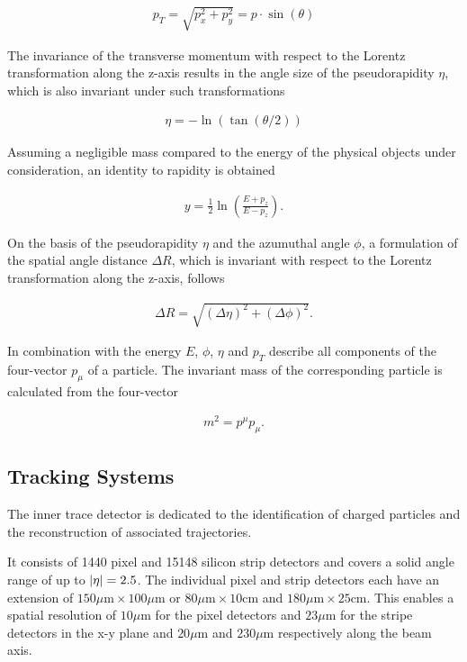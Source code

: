 \documentclass[12pt, a4paper]{thesis}
\begin{document}
\begin{align}
  p_T = \sqrt{p_x^2 + p_y^2} = p \cdot \sin(\theta)
\end{align}

The invariance of the transverse momentum with respect to the Lorentz
transformation along the z-axis results in the angle size of the
pseudorapidity \(\eta\), which is also invariant under such
transformations

\begin{align}
  \eta = - \ln(\tan(\theta/2))
\end{align}

Assuming a negligible mass compared to the energy of the physical
objects under consideration, an identity to rapidity is obtained

\begin{align}
  y = \frac{1}{2} \ln(\frac{E+p_z}{E-p_z}).
\end{align}

On the basis of the pseudorapidity \(\eta\) and the azumuthal angle
\(\phi\), a formulation of the spatial angle distance \(\Delta R\),
which is invariant with respect to the Lorentz transformation along
the z-axis, follows

\begin{align}
  \Delta R = \sqrt{(\Delta \eta)^{2} + (\Delta \phi)^{2}}.
\end{align}

In combination with the energy \(E\), \(\phi\), \(\eta\) and \(p_{T}\)
describe all components of the four-vector \(p_{\mu}\) of a
particle. The invariant mass of the corresponding particle is
calculated from the four-vector

\begin{align}
  m^{2} = p^{\mu}p_{\mu}.
\end{align}

\subsection{Tracking Systems}
\label{sec:org139ed11}
The inner trace detector is dedicated to the identification of charged
particles and the reconstruction of associated trajectories.

It consists of 1440 pixel and 15148 silicon strip detectors and covers
a solid angle range of up to \(\abs{\eta} = 2.5\). The individual
pixel and strip detectors each have an extension of \(150\mu \text{m}
\times 100 \mu \text{m}\) or \(80\mu \text{m} \times 10 \text{cm}\)
and \(180\mu \text{m} \times 25 \text{cm}\).  This enables a spatial
resolution of \(10\mu \text{m}\) for the pixel detectors and \(23\mu
\text{m}\) for the stripe detectors in the x-y plane and \(20\mu
\text{m}\) and \(230\mu \text{m}\) respectively along the beam axis.
\end{document}
